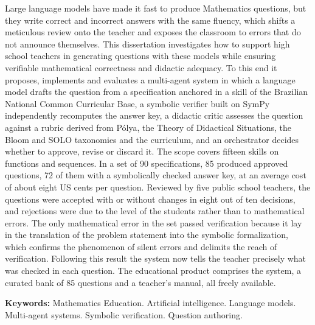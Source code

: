 Large language models have made it fast to produce Mathematics questions, but they write correct and
incorrect answers with the same fluency, which shifts a meticulous review onto the teacher and exposes
the classroom to errors that do not announce themselves. This dissertation investigates how to support
high school teachers in generating questions with these models while ensuring verifiable mathematical
correctness and didactic adequacy. To this end it proposes, implements and evaluates a multi-agent
system in which a language model drafts the question from a specification anchored in a skill of the
Brazilian National Common Curricular Base, a symbolic verifier built on SymPy independently recomputes
the answer key, a didactic critic assesses the question against a rubric derived from Pólya, the
Theory of Didactical Situations, the Bloom and SOLO taxonomies and the curriculum, and an orchestrator
decides whether to approve, revise or discard it. The scope covers fifteen skills on functions and
sequences. In a set of 90 specifications, 85 produced approved questions, 72 of them with a
symbolically checked answer key, at an average cost of about eight US cents per question. Reviewed by
five public school teachers, the questions were accepted with or without changes in eight out of ten
decisions, and rejections were due to the level of the students rather than to mathematical errors.
The only mathematical error in the set passed verification because it lay in the translation of the
problem statement into the symbolic formalization, which confirms the phenomenon of silent errors and
delimits the reach of verification. Following this result the system now tells the teacher precisely
what was checked in each question. The educational product comprises the system, a curated bank of 85
questions and a teacher's manual, all freely available.

\medskip
\noindent\textbf{Keywords:} Mathematics Education. Artificial intelligence. Language models.
Multi-agent systems. Symbolic verification. Question authoring.
